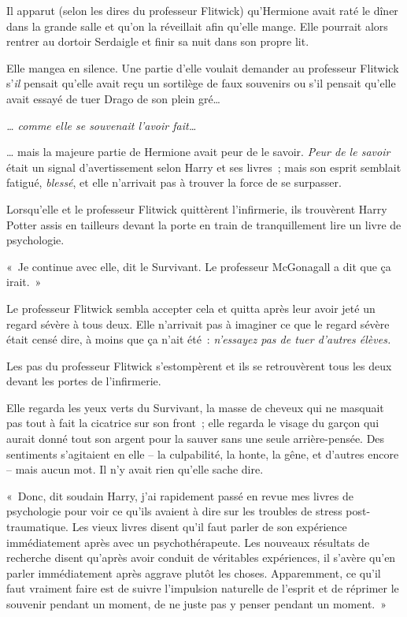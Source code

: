 Il apparut (selon les dires du professeur Flitwick) qu'Hermione avait raté le dîner dans la grande salle et qu'on la réveillait afin qu'elle mange. Elle pourrait alors rentrer au dortoir Serdaigle et finir sa nuit dans son propre lit.

Elle mangea en silence. Une partie d'elle voulait demander au professeur Flitwick s'\emph{il} pensait qu'elle avait reçu un sortilège de faux souvenirs ou s'il pensait qu'elle avait essayé de tuer Drago de son plein gré…

\emph{… comme elle se souvenait l'avoir fait…}

… mais la majeure partie de Hermione avait peur de le savoir. \emph{Peur de le savoir} était un signal d'avertissement selon Harry et ses livres~; mais son esprit semblait fatigué, \emph{blessé}, et elle n'arrivait pas à trouver la force de se surpasser.

Lorsqu'elle et le professeur Flitwick quittèrent l'infirmerie, ils trouvèrent Harry Potter assis en tailleurs devant la porte en train de tranquillement lire un livre de psychologie.

«~Je continue avec elle, dit le Survivant. Le professeur McGonagall a dit que ça irait.~»

Le professeur Flitwick sembla accepter cela et quitta après leur avoir jeté un regard sévère à tous deux. Elle n'arrivait pas à imaginer ce que le regard sévère était censé dire, à moins que ça n'ait été~: \emph{n'essayez pas de tuer d'autres élèves.}

Les pas du professeur Flitwick s'estompèrent et ils se retrouvèrent tous les deux devant les portes de l'infirmerie.

Elle regarda les yeux verts du Survivant, la masse de cheveux qui ne masquait pas tout à fait la cicatrice sur son front~; elle regarda le visage du garçon qui aurait donné tout son argent pour la sauver sans une seule arrière-pensée. Des sentiments s'agitaient en elle -- la culpabilité, la honte, la gêne, et d'autres encore -- mais aucun mot. Il n'y avait rien qu'elle sache dire.

«~Donc, dit soudain Harry, j'ai rapidement passé en revue mes livres de psychologie pour voir ce qu'ils avaient à dire sur les troubles de stress post-traumatique. Les vieux livres disent qu'il faut parler de son expérience immédiatement après avec un psychothérapeute. Les nouveaux résultats de recherche disent qu'après avoir conduit de véritables expériences, il s'avère qu'en parler immédiatement après aggrave plutôt les choses. Apparemment, ce qu'il faut vraiment faire est de suivre l'impulsion naturelle de l'esprit et de réprimer le souvenir pendant un moment, de ne juste pas y penser pendant un moment.~»

